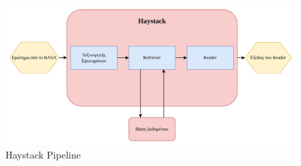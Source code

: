 \begin{figure}[!ht]
  \centering
  \captionsetup{justification=centering}
  \includegraphics[width=1\textwidth]{images/chapter4/haystack.png}
  \caption{Haystack Pipeline}
  \label{fig:haystack-pipeline}
\end{figure}
\noindent